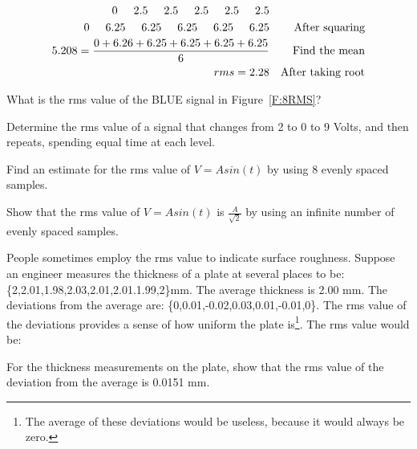 \begin{align*}
0 \hspace{.5cm}2.5 \hspace{.5cm} 2.5 \hspace{.5cm} 2.5 \hspace{.5cm} 2.5 \hspace{.5cm} 2.5\\
0 \hspace{.5cm}6.25 \hspace{.5cm}6.25 \hspace{.5cm}6.25\hspace{.5cm}6.25 \hspace{.5cm}6.25&&\text{After squaring}\\
5.208=\frac{0+6.26+6.25+6.25+6.25+6.25}{6}&&\text{Find the mean}\\
rms=2.28&&\text{After taking root}\\
\end{align*}

\begin{blevel}
What is the rms value of the BLUE signal in Figure~\ref{F:8RMS}?
\end{blevel}

\begin{alevel}
Determine the rms value of a signal that changes from 2 to 0 to 9 Volts, and then repeats, spending equal time at each level.
\end{alevel}

\begin{blevel}
Find an estimate for the rms value of $V = Asin(t)$ by using 8 evenly spaced samples.
\end{blevel}

\begin{dlevel}
Show that the rms value of $V = Asin(t)$ is $\frac{A}{\sqrt{2}}$ by using an infinite number of evenly spaced samples.
\end{dlevel}

\par
People sometimes employ the rms value to indicate surface roughness. Suppose an engineer measures the thickness of a plate at several places to be: \{2,2.01,1.98,2.03,2.01,2.01.1.99,2\}mm. The average thickness is 2.00 mm. The deviations from the average are: \{0,0.01,-0.02,0.03,0.01,-0.01,0\}. The rms value of the deviations provides a sense of how uniform the plate is\footnote{The average of these deviations would be useless, because it would always be zero.}. The rms value would be:

\begin{blevel}
For the thickness measurements on the plate, show that the rms value of the deviation from the average is 0.0151 mm.
\end{blevel}

